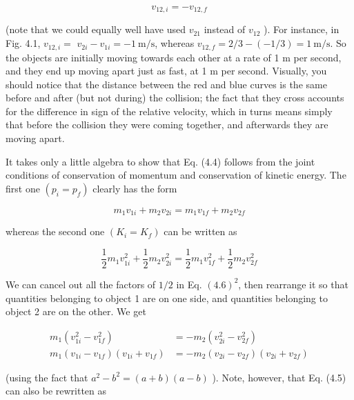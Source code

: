 \documentclass[10pt]{article}
\begin{document}
\begin{equation*}
v_{12, i}=-v_{12, f} \tag{4.4}
\end{equation*}


(note that we could equally well have used $v_{21}$ instead of $v_{12}$ ). For instance, in Fig. 4.1, $v_{12, i}=$ $v_{2 i}-v_{1 i}=-1 \mathrm{~m} / \mathrm{s}$, whereas $v_{12, f}=2 / 3-(-1 / 3)=1 \mathrm{~m} / \mathrm{s}$. So the objects are initially moving towards each other at a rate of 1 m per second, and they end up moving apart just as fast, at 1 m per second. Visually, you should notice that the distance between the red and blue curves is the same before and after (but not during) the collision; the fact that they cross accounts for the difference in sign of the relative velocity, which in turns means simply that before the collision they were coming together, and afterwards they are moving apart.

It takes only a little algebra to show that Eq. (4.4) follows from the joint conditions of conservation of momentum and conservation of kinetic energy. The first one $\left(p_{i}=p_{f}\right)$ clearly has the form


\begin{equation*}
m_{1} v_{1 i}+m_{2} v_{2 i}=m_{1} v_{1 f}+m_{2} v_{2 f} \tag{4.5}
\end{equation*}


whereas the second one $\left(K_{i}=K_{f}\right)$ can be written as


\begin{equation*}
\frac{1}{2} m_{1} v_{1 i}^{2}+\frac{1}{2} m_{2} v_{2 i}^{2}=\frac{1}{2} m_{1} v_{1 f}^{2}+\frac{1}{2} m_{2} v_{2 f}^{2} \tag{4.6}
\end{equation*}


We can cancel out all the factors of $1 / 2$ in Eq. $(4.6)^{2}$, then rearrange it so that quantities belonging to object 1 are on one side, and quantities belonging to object 2 are on the other. We get


\begin{align*}
m_{1}\left(v_{1 i}^{2}-v_{1 f}^{2}\right) & =-m_{2}\left(v_{2 i}^{2}-v_{2 f}^{2}\right) \\
m_{1}\left(v_{1 i}-v_{1 f}\right)\left(v_{1 i}+v_{1 f}\right) & =-m_{2}\left(v_{2 i}-v_{2 f}\right)\left(v_{2 i}+v_{2 f}\right) \tag{4.7}
\end{align*}


(using the fact that $a^{2}-b^{2}=(a+b)(a-b)$ ). Note, however, that Eq. (4.5) can also be rewritten as
\end{document}
